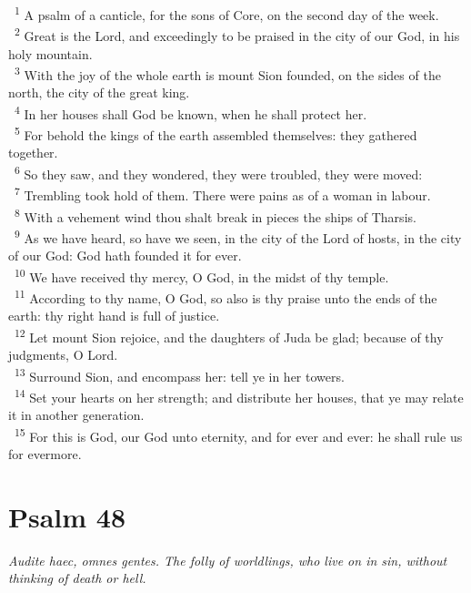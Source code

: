 \documentclass[a5paper,12pt]{article}
\begin{document}
\begin{multicols*}{2}
~\textsuperscript{1} A psalm of a canticle, for the sons of Core, on the second day of the week.\\
~\textsuperscript{2} Great is the Lord, and exceedingly to be praised in the city of our God, in his holy mountain.\\
~\textsuperscript{3} With the joy of the whole earth is mount Sion founded, on the sides of the north, the city of the great king.\\
~\textsuperscript{4} In her houses shall God be known, when he shall protect her.\\
~\textsuperscript{5} For behold the kings of the earth assembled themselves: they gathered together.\\
~\textsuperscript{6} So they saw, and they wondered, they were troubled, they were moved:\\
~\textsuperscript{7} Trembling took hold of them. There were pains as of a woman in labour.\\
~\textsuperscript{8} With a vehement wind thou shalt break in pieces the ships of Tharsis.\\
~\textsuperscript{9} As we have heard, so have we seen, in the city of the Lord of hosts, in the city of our God: God hath founded it for ever.\\
~\textsuperscript{10} We have received thy mercy, O God, in the midst of thy temple.\\
~\textsuperscript{11} According to thy name, O God, so also is thy praise unto the ends of the earth: thy right hand is full of justice.\\
~\textsuperscript{12} Let mount Sion rejoice, and the daughters of Juda be glad; because of thy judgments, O Lord.\\
~\textsuperscript{13} Surround Sion, and encompass her: tell ye in her towers.\\
~\textsuperscript{14} Set your hearts on her strength; and distribute her houses, that ye may relate it in another generation.\\
~\textsuperscript{15} For this is God, our God unto eternity, and for ever and ever: he shall rule us for evermore.\\

\section{Psalm 48}
\label{sec:org925ffde}
\emph{Audite haec, omnes gentes. The folly of worldlings, who live on in sin, without thinking of death or hell.}\\


\end{multicols*}
\end{document}
